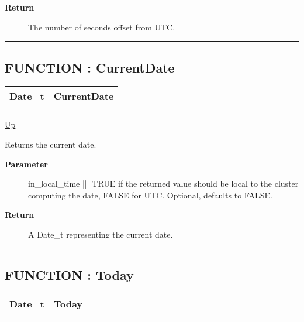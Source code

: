 \par
\begin{description}
\item [\textbf{Return}] The number of seconds offset from UTC.
\end{description}

\rule{\textwidth}{0.4pt}
\subsection*{FUNCTION : CurrentDate}
\hypertarget{ecldoc:date.currentdate}{}

{\renewcommand{\arraystretch}{1.5}
\begin{tabularx}{\textwidth}{|>{\raggedright\arraybackslash}l|X|}
\hline
\hspace{0pt}Date\_t & CurrentDate \\
\hline
\multicolumn{2}{|>{\raggedright\arraybackslash}X|}{\hspace{0pt}(BOOLEAN in\_local\_time = FALSE)} \\
\hline
\end{tabularx}
}

\hyperlink{ecldoc:Date}{Up}

\par
Returns the current date.

\par
\begin{description}
\item [\textbf{Parameter}] in\_local\_time ||| TRUE if the returned value should be local to the cluster computing the date, FALSE for UTC. Optional, defaults to FALSE.
\item [\textbf{Return}] A Date\_t representing the current date.
\end{description}

\rule{\textwidth}{0.4pt}
\subsection*{FUNCTION : Today}
\hypertarget{ecldoc:date.today}{}

{\renewcommand{\arraystretch}{1.5}
\begin{tabularx}{\textwidth}{|>{\raggedright\arraybackslash}l|X|}
\hline
\hspace{0pt}Date\_t & Today \\
\hline
\multicolumn{2}{|>{\raggedright\arraybackslash}X|}{\hspace{0pt}()} \\
\hline
\end{tabularx}
}

